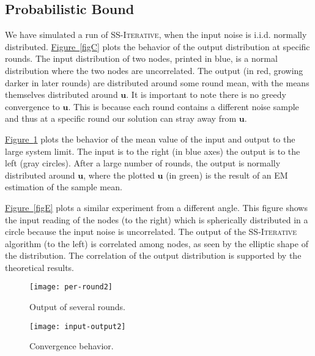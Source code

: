 \documentclass[preprint,12pt]{elsarticle}
\newcommand{\namedref}[2]{\hyperref[#2]{#1~\ref*{#2}}}
\newcommand{\figureref}[1]{\namedref{Figure}{#1}}
\newcommand{\syncAlg}{\textsc{SS-Iterative}\xspace}
\newcommand{\uu}{\mathbf{u}}
\begin{document}
\subsection{Probabilistic Bound}
We have simulated a run of \syncAlg, when the input noise is i.i.d. normally distributed.
\figureref{figC} plots the behavior of the output distribution at specific rounds. The input distribution of two nodes, printed in blue, is a normal distribution where the two nodes are uncorrelated. The output (in red, growing darker in later rounds) are distributed around some round mean, with the means themselves distributed around $\uu$. It is important to note there is no greedy convergence to $\uu$. This is because each round contains a different noise sample and thus at a specific round our solution can stray away from $\uu$.

\figureref{figD} plots the behavior of the mean value of the input and output to the large system limit. The input
 is to the right (in blue axes) the output is to the left (gray circles). After a large number of rounds, the output is normally distributed around $\uu$, where the plotted $\uu$ (in green) is the result of an EM estimation of the sample mean.

\figureref{figE} plots a similar experiment from a different angle. 
This figure shows the input reading of the nodes (to the right) which is spherically distributed in a circle because the input noise is uncorrelated. The output of the \syncAlg algorithm (to the left) is correlated among nodes, as seen by the elliptic shape of the distribution. The correlation of the output distribution is supported by the theoretical results.

\begin{figure}[h!]
\begin{minipage}[b]{0.5\linewidth}
\centering
  \hspace{1.25in} \texttt{[image: per-round2]}
  \vspace{-0.5cm}
  \caption{Output of several rounds.}
  \label{figC}
\end{minipage}
\begin{minipage}[b]{0.5\linewidth}
\centering
  \hspace{1.25in} \texttt{[image: input-output2]}
  \vspace{-0.5cm}
  \caption{Convergence behavior.}
  \label{figD}
\end{minipage}
\end{figure}

\begin{figure}[h!]
\end{figure}
\end{document}
